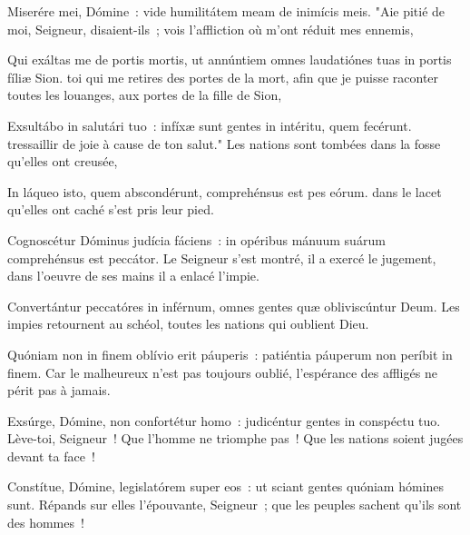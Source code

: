 
\begin{paracol}{2}

    \LigneParacol{0cm}
    {Miserére mei, Dómine~: \GreStar{} vide humilitátem meam de inimícis meis.}
    {"Aie pitié de moi, Seigneur, disaient-ils~; vois l'affliction où m'ont réduit mes ennemis,}

    \LigneParacol{0.2cm}
    {Qui exáltas me de portis mortis, \GreStar{} ut annúntiem omnes laudatiónes tuas in portis fíliæ Sion.}
    {toi qui me retires des portes de la mort, afin que je puisse raconter toutes les louanges, aux portes de la fille de Sion,}

    \LigneParacol{0.2cm}
    {Exsultábo in salutári tuo~: \GreStar{} infíxæ sunt gentes in intéritu, quem fecérunt.}
    {tressaillir de joie à cause de ton salut." Les nations sont tombées dans la fosse qu'elles ont creusée,}

    \LigneParacol{0.2cm}
    {In láqueo isto, quem abscondérunt, \GreStar{} comprehénsus est pes eórum.}
    {dans le lacet qu'elles ont caché s'est pris leur pied.}

    \LigneParacol{0.2cm}
    {Cognoscétur Dóminus judícia fá\-ciens~: \GreStar{} in opéribus mánuum suárum comprehénsus est peccátor.}
    {Le Seigneur s'est montré, il a exercé le jugement, dans l'oeuvre de ses mains il a enlacé l'impie.}

    \LigneParacol{0.2cm}
    {Convertántur peccatóres in inférnum, \GreStar{} omnes gentes quæ obliviscúntur Deum.}
    {Les impies retournent au schéol, toutes les nations qui oublient Dieu.}

    \LigneParacol{0.2cm}
    {Quóniam non in finem oblívio erit páuperis~: \GreStar{} patiéntia páuperum non períbit in finem.}
    {Car le malheureux n'est pas toujours oublié, l'espérance des affligés ne périt pas à jamais. }

    \LigneParacol{0.2cm}
    {Exsúrge, Dómine, non confortétur homo~: \GreStar{} judicéntur gentes in conspéctu tuo.}
    {Lève-toi, Seigneur~! Que l'homme ne triomphe pas~! Que les nations soient jugées devant ta face~! }

    \LigneParacol{0.2cm}
    {Constítue, Dómine, legislatórem super eos~: \GreStar{} ut sciant gentes quóniam hómines sunt.}
    {Répands sur elles l'épouvante, Seigneur~; que les peuples sachent qu'ils sont des hommes~!}

\end{paracol}
\Gloria
